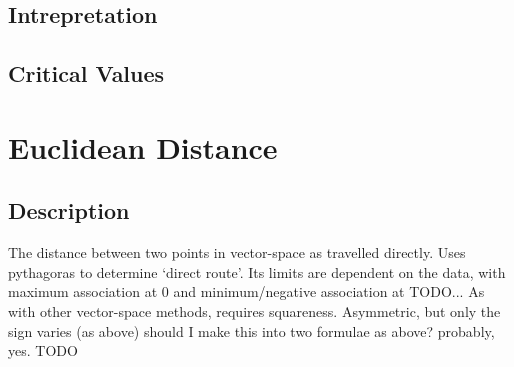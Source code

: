 \documentclass[11pt]{article}
\begin{document}
\subsection{Intrepretation}

\subsection{Critical Values}














\section{Euclidean Distance}
\label{section:euclid}
\subsection{Description}
The distance between two points in vector-space as travelled directly.  
Uses pythagoras to determine `direct route'.  
Its limits are dependent on the data, with maximum association at 0 and minimum/negative association at TODO...  
As with other vector-space methods, requires squareness.  
Asymmetric, but only the sign varies (as above)
{\color{red} should I make this into two formulae as above? probably, yes. TODO}
\end{document}

